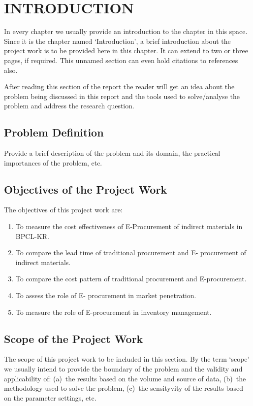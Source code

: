 \chapter{INTRODUCTION}\label{chap1}
\thispagestyle{empty}

In every chapter we usually provide an introduction to the chapter in this space. Since it is the chapter named `Introduction', a brief introduction about the project work is to be provided here in this chapter. It can extend to two or three pages, if required. This unnamed section can even hold citations to references also.

After reading this section of the report the reader will get an idea about the problem being discussed in this report and the tools used to solve/analyse the problem and address the research question. 

\section{Problem Definition}

Provide a brief description of the problem and its domain, the practical importances of the problem, etc.


\section{Objectives of the Project Work}

The objectives of this project work are:
\begin{enumerate}
\item  To measure the cost effectiveness of E-Procurement of indirect materials in BPCL-KR.
\item  To compare the lead time of traditional procurement and E- procurement of indirect materials.
\item  To compare the cost pattern of traditional procurement and E-procurement.
\item To assess the role of E- procurement in market penetration.
\item To measure the role of E-procurement in inventory management.
\end{enumerate}



\section{Scope of the Project Work}

The scope of this project work to be included in this section. By the term `scope' we usually intend to provide the boundary of the problem and the validity and applicability  of: (a)~the results based on the volume and source of data, (b)~the methodology used to solve the problem, (c)~the sensityvity of the results based on the parameter settings, etc.



